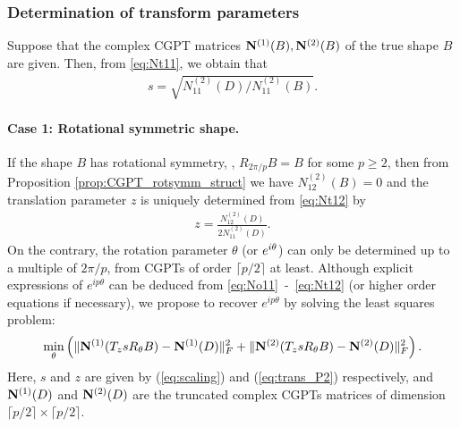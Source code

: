 \subsubsection{Determination of transform
  parameters}\label{sec:determ-transf-param}
Suppose that the complex CGPT matrices $\mathbf{N}^{(1)}(B), \mathbf{N}^{(2)}(B)$ of the
true shape $B$ are given. Then, from \eqref{eq:Nt11}, we obtain
that
\begin{align}
  s = \sqrt{N_{11}^{(2)}(D) / N_{11}^{(2)}(B)}. \label{eq:scaling}
\end{align}

\paragraph{Case 1: Rotational symmetric shape.}
If the shape $B$ has rotational symmetry, \ie, $R_{2\pi /p}B =B$
for some $p\geq 2$, then from Proposition
\ref{prop:CGPT_rotsymm_struct} we have $N_{12}^{(2)}(B)=0$ and the
translation parameter $z$ is uniquely determined from
\eqref{eq:Nt12} by
\begin{align}
  z = \frac{N_{12}^{(2)}(D)}{2N_{11}^{(2)}(D)}. \label{eq:trans_P2}
\end{align}
On the contrary, the rotation parameter $\theta$ (or $e^{i\theta}$) can
only be determined up to a multiple of ${2\pi/p}$, from CGPTs of
order $\lceil p/2 \rceil$ at least. Although explicit expressions
of $e^{ip\theta}$ can be deduced from
\eqref{eq:No11}~-~\eqref{eq:Nt12} (or higher order equations if
necessary), we propose to recover $e^{ip\theta}$ by solving the
least squares problem:
\begin{align}
  \min_\theta \left(\mathopen\| \mathbf{N}^{(1)}({T_zsR_\theta} B) - \mathbf{N}^{(1)}(D) \mathclose\|_F^2 + \mathopen\| \mathbf{N}^{(2)}({T_zsR_\theta}
      B) - \mathbf{N}^{(2)}(D) \mathclose\|_F^2\right).  \label{eq:rot_lst}
\end{align}
Here, $s$ and $z$ are given by (\ref{eq:scaling}) and
(\ref{eq:trans_P2}) respectively, and $\mathbf{N}^{(1)}(D)$ and $\mathbf{N}^{(2)}(D)$ are
the truncated complex CGPTs matrices of dimension $\lceil p/2
\rceil \times \lceil p/2 \rceil$.


